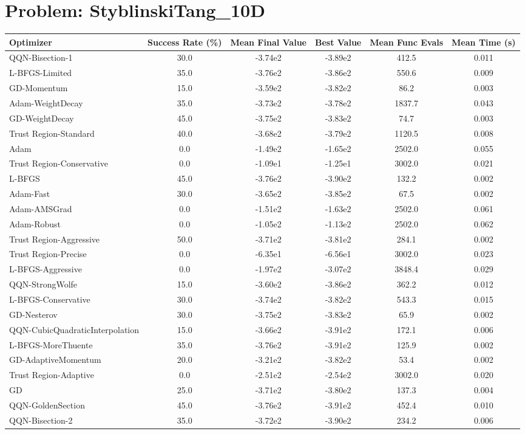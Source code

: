 \documentclass{article}
\begin{document}
\section{Problem: StyblinskiTang\_10D}
\begin{longtable}{p{3cm}*{5}{c}}
\toprule
\textbf{Optimizer} & \textbf{Success Rate (\%)} & \textbf{Mean Final Value} & \textbf{Best Value} & \textbf{Mean Func Evals} & \textbf{Mean Time (s)} \\
\midrule
QQN-Bisection-1 & 30.0 & -3.74e2 & -3.89e2 & 412.5 & 0.011 \\
L-BFGS-Limited & 35.0 & -3.76e2 & -3.86e2 & 550.6 & 0.009 \\
GD-Momentum & 15.0 & -3.59e2 & -3.82e2 & 86.2 & 0.003 \\
Adam-WeightDecay & 35.0 & -3.73e2 & -3.78e2 & 1837.7 & 0.043 \\
GD-WeightDecay & 45.0 & -3.75e2 & -3.83e2 & 74.7 & 0.003 \\
Trust Region-Standard & 40.0 & -3.68e2 & -3.79e2 & 1120.5 & 0.008 \\
Adam & 0.0 & -1.49e2 & -1.65e2 & 2502.0 & 0.055 \\
Trust Region-Conservative & 0.0 & -1.09e1 & -1.25e1 & 3002.0 & 0.021 \\
L-BFGS & 45.0 & -3.76e2 & -3.90e2 & 132.2 & 0.002 \\
Adam-Fast & 30.0 & -3.65e2 & -3.85e2 & 67.5 & 0.002 \\
Adam-AMSGrad & 0.0 & -1.51e2 & -1.63e2 & 2502.0 & 0.061 \\
Adam-Robust & 0.0 & -1.05e2 & -1.13e2 & 2502.0 & 0.062 \\
Trust Region-Aggressive & 50.0 & -3.71e2 & -3.81e2 & 284.1 & 0.002 \\
Trust Region-Precise & 0.0 & -6.35e1 & -6.56e1 & 3002.0 & 0.023 \\
L-BFGS-Aggressive & 0.0 & -1.97e2 & -3.07e2 & 3848.4 & 0.029 \\
QQN-StrongWolfe & 15.0 & -3.60e2 & -3.86e2 & 362.2 & 0.012 \\
L-BFGS-Conservative & 30.0 & -3.74e2 & -3.82e2 & 543.3 & 0.015 \\
GD-Nesterov & 30.0 & -3.75e2 & -3.83e2 & 65.9 & 0.002 \\
QQN-CubicQuadraticInterpolation & 15.0 & -3.66e2 & -3.91e2 & 172.1 & 0.006 \\
L-BFGS-MoreThuente & 35.0 & -3.76e2 & -3.91e2 & 125.9 & 0.002 \\
GD-AdaptiveMomentum & 20.0 & -3.21e2 & -3.82e2 & 53.4 & 0.002 \\
Trust Region-Adaptive & 0.0 & -2.51e2 & -2.54e2 & 3002.0 & 0.020 \\
GD & 25.0 & -3.71e2 & -3.80e2 & 137.3 & 0.004 \\
QQN-GoldenSection & 45.0 & -3.76e2 & -3.91e2 & 452.4 & 0.010 \\
QQN-Bisection-2 & 35.0 & -3.72e2 & -3.90e2 & 234.2 & 0.006 \\
\bottomrule
\end{longtable}
\end{document}
